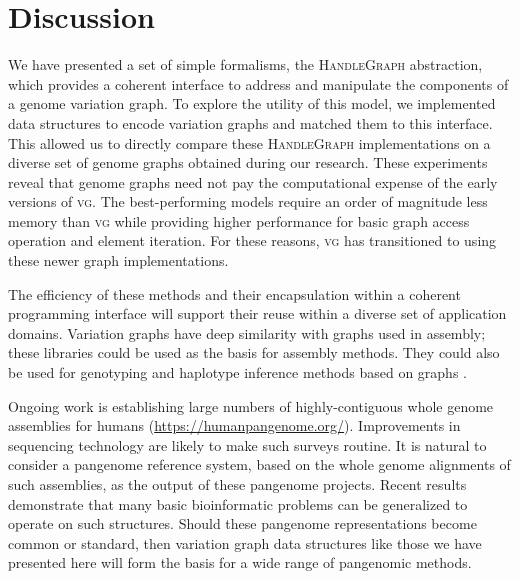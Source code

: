 \documentclass{article}
\begin{document}
\section{Discussion}

We have presented a set of simple formalisms, the \textsc{HandleGraph} abstraction, which provides a coherent interface to address and manipulate the components of a genome variation graph.
To explore the utility of this model, we implemented data structures to encode variation graphs and matched them to this interface.
This allowed us to directly compare these \textsc{HandleGraph} implementations on a diverse set of genome graphs obtained during our research.
These experiments reveal that genome graphs need not pay the computational expense of the early versions of \textsc{vg}.
The best-performing models require an order of magnitude less memory than \textsc{vg} while providing higher performance for basic graph access operation and element iteration.
For these reasons, \textsc{vg} has transitioned to using these newer graph implementations. 

The efficiency of these methods and their encapsulation within a coherent programming interface will support their reuse within a diverse set of application domains.
Variation graphs have deep similarity with graphs used in assembly; these libraries could be used as the basis for assembly methods.
They could also be used for genotyping and haplotype inference methods based on graphs \cite{garg2018graph}.

Ongoing work is establishing large numbers of highly-contiguous whole genome assemblies for humans (\url{https://humanpangenome.org/}).
Improvements in sequencing technology are likely to make such surveys routine.
It is natural to consider a pangenome reference system, based on the whole genome alignments of such assemblies, as the output of these pangenome projects.
Recent results demonstrate that many basic bioinformatic problems can be generalized to operate on such structures.
Should these pangenome representations become common or standard, then variation graph data structures like those we have presented here will form the basis for a wide range of pangenomic methods.


\end{document}
